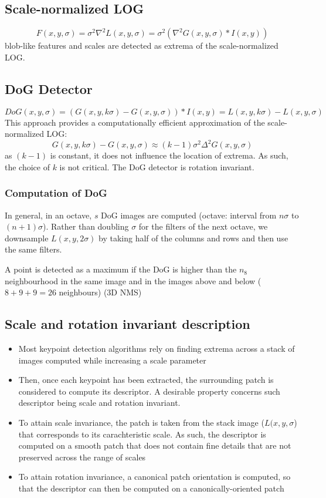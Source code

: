 \documentclass{article}
\begin{document}
\subsection{Scale-normalized LOG}
\[
    F(x,y,\sigma) = \sigma^2\nabla^2L(x,y,\sigma) = \sigma^2(\nabla^2 G(x,y,\sigma)\ast I(x,y))
\]
blob-like features and scales are detected as extrema of the scale-normalized LOG.
\subsection{DoG Detector}
\[
    DoG(x,y,\sigma) = (G(x,y,k\sigma)-G(x,y,\sigma))\ast I(x,y) = L(x,y,k\sigma)-L(x,y,\sigma)
\]
This approach provides a computationally efficient approximation of the scale-normalized LOG:
\[
    G(x,y,k\sigma)-G(x,y,\sigma)\approx (k-1)\sigma^2\Delta^2 G(x,y,\sigma)
\]
as $(k-1)$ is constant, it does not influence the location of extrema. As such, the choice of $k$ is not critical. The DoG detector is rotation invariant.
\subsubsection{Computation of DoG}
In general, in an octave, $s$ DoG images are computed (octave: interval from $n\sigma$ to $(n+1)\sigma$). Rather than doubling $\sigma$ for the filters of the next octave, we downsample $L(x,y,2\sigma)$ by taking half of the columns and rows and then use the same filters.

A point is detected as a maximum if the DoG is higher than the $n_8$ neighbourhood in the same image and in the images above and below ($8+9+9=26$ neighbours) (3D NMS)

\subsection{Scale and rotation invariant description}
\begin{itemize}
    \item Most keypoint detection algorithms rely on finding extrema across a stack of images computed while increasing a scale parameter 
    \item Then, once each keypoint has been extracted, the surrounding patch is considered to compute its descriptor. A desirable property concerns such descriptor being scale and rotation invariant.
    \item To attain scale invariance, the patch is taken from the stack image ($L(x,y,\sigma$) that corresponds to its carachteristic scale. As such, the descriptor is computed on a smooth patch that does not contain fine details that are not preserved across the range of scales
    \item To attain rotation invariance, a canonical patch orientation is computed, so that the descriptor can then be computed on a canonically-oriented patch
\end{itemize}
\end{document}
